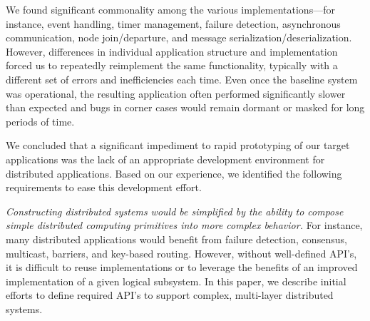 We found significant commonality among the various
implementations---for instance, event handling, timer management,
failure detection, asynchronous communication, node join/departure, and
message serialization/deserialization.  However, differences in
individual application structure and implementation forced us to
repeatedly reimplement the same functionality, typically with a
different set of errors and inefficiencies each time.  Even once the
baseline system was operational, the resulting application often
performed significantly slower than expected and bugs in corner cases
would remain dormant or masked for long periods of time.

We concluded that a significant impediment to rapid prototyping of our
target applications was the lack of an appropriate development
environment for distributed applications.  Based on our experience, we
identified the following requirements to ease this development effort.

\emph{Constructing distributed systems would be simplified by the
ability to compose simple distributed computing primitives into more
complex behavior.} For instance, many distributed applications would
benefit from failure detection, consensus, multicast, barriers, and
key-based routing.  However, without well-defined API's, it is
difficult to reuse implementations or to leverage the benefits of an
improved implementation of a given logical subsystem.  In this paper,
we describe initial efforts to define required API's to support
complex, multi-layer distributed systems.


